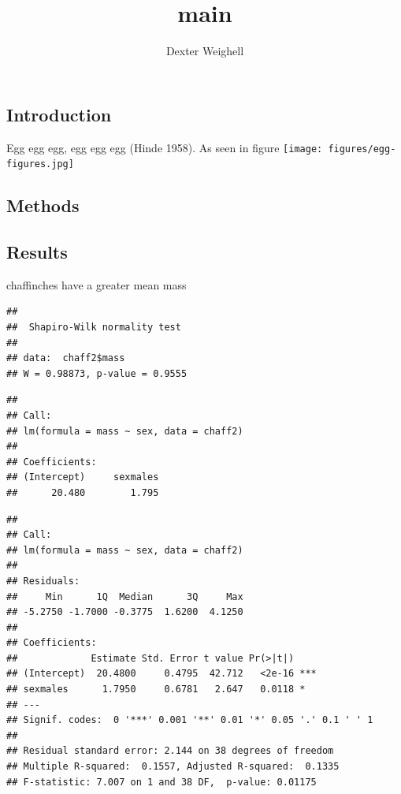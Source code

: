 \documentclass[
]{article}
\title{main}
\author{Dexter Weighell}
\date{}
\begin{document}
\maketitle

{
\setcounter{tocdepth}{2}
\tableofcontents
}
\hypertarget{introduction}{%
\subsection{\texorpdfstring{\textbf{Introduction}}{Introduction}}\label{introduction}}

Egg egg egg, egg egg egg (Hinde 1958). As seen in figure \texttt{[image: figures/egg-figures.jpg]}

\hypertarget{methods}{%
\subsection{\texorpdfstring{\textbf{Methods}}{Methods}}\label{methods}}

\hypertarget{results}{%
\subsection{\texorpdfstring{\textbf{Results}}{Results}}\label{results}}

chaffinches have a greater mean mass

\begin{verbatim}
## 
##  Shapiro-Wilk normality test
## 
## data:  chaff2$mass
## W = 0.98873, p-value = 0.9555
\end{verbatim}

\begin{verbatim}
## 
## Call:
## lm(formula = mass ~ sex, data = chaff2)
## 
## Coefficients:
## (Intercept)     sexmales  
##      20.480        1.795
\end{verbatim}

\begin{verbatim}
## 
## Call:
## lm(formula = mass ~ sex, data = chaff2)
## 
## Residuals:
##     Min      1Q  Median      3Q     Max 
## -5.2750 -1.7000 -0.3775  1.6200  4.1250 
## 
## Coefficients:
##             Estimate Std. Error t value Pr(>|t|)    
## (Intercept)  20.4800     0.4795  42.712   <2e-16 ***
## sexmales      1.7950     0.6781   2.647   0.0118 *  
## ---
## Signif. codes:  0 '***' 0.001 '**' 0.01 '*' 0.05 '.' 0.1 ' ' 1
## 
## Residual standard error: 2.144 on 38 degrees of freedom
## Multiple R-squared:  0.1557, Adjusted R-squared:  0.1335 
## F-statistic: 7.007 on 1 and 38 DF,  p-value: 0.01175
\end{verbatim}
\end{document}
